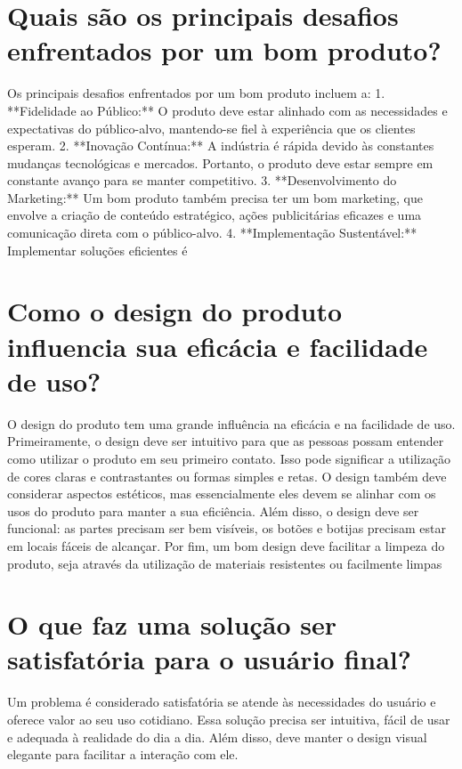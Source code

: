 \documentclass[11pt,a4paper]{article}
\begin{document}
\section{Quais são os principais desafios enfrentados por um bom produto?}
Os principais desafios enfrentados por um bom produto incluem a: 1. **Fidelidade ao Público:** O produto deve estar alinhado com as necessidades e expectativas do público-alvo, mantendo-se fiel à experiência que os clientes esperam. 2. **Inovação Contínua:** A indústria é rápida devido às constantes mudanças tecnológicas e mercados. Portanto, o produto deve estar sempre em constante avanço para se manter competitivo. 3. **Desenvolvimento do Marketing:** Um bom produto também precisa ter um bom marketing, que envolve a criação de conteúdo estratégico, ações publicitárias eficazes e uma comunicação direta com o público-alvo. 4. **Implementação Sustentável:** Implementar soluções eficientes é

\section{Como o design do produto influencia sua eficácia e facilidade de uso?}
O design do produto tem uma grande influência na eficácia e na facilidade de uso. Primeiramente, o design deve ser intuitivo para que as pessoas possam entender como utilizar o produto em seu primeiro contato. Isso pode significar a utilização de cores claras e contrastantes ou formas simples e retas. O design também deve considerar aspectos estéticos, mas essencialmente eles devem se alinhar com os usos do produto para manter a sua eficiência. Além disso, o design deve ser funcional: as partes precisam ser bem visíveis, os botões e botijas precisam estar em locais fáceis de alcançar. Por fim, um bom design deve facilitar a limpeza do produto, seja através da utilização de materiais resistentes ou facilmente limpas

\section{O que faz uma solução ser satisfatória para o usuário final?}
Um problema é considerado satisfatória se atende às necessidades do usuário e oferece valor ao seu uso cotidiano. Essa solução precisa ser intuitiva, fácil de usar e adequada à realidade do dia a dia. Além disso, deve manter o design visual elegante para facilitar a interação com ele.
\end{document}

